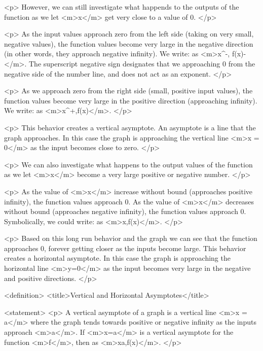         <p>
            However, we can still investigate what happends to the outputs of the function as we let <m>x</m> get very close to a value of 0.
        </p>

        <p>
            As the input values approach zero from the left side (taking on very small, negative values), the function values become very large in the negative direction (in other words, they approach negative infinity).
            We write: as <m>x^{-}, f(x)\to -\infty</m>.
            The superscript negative sign designates that we approaching 0 from the negative side of the number line, and does not act as an exponent.
        </p>

        <p>
            As we approach zero from the right side (small, positive input values), the function values become very large in the positive direction (approaching infinity).
            We write: as <m>x^{+},f(x)\to \infty</m>.
        </p>

        <p>
            This behavior creates a vertical asymptote.
            An asymptote is a line that the graph approaches.
            In this case the graph is approaching the vertical line <m>x = 0</m> as the input becomes close to zero.
        </p>

        <p>
            We can also investigate what happens to the output values of the function as we let <m>x</m> become a very large positive or negative number.
        </p>

        <p>
            As the value of <m>x</m> increase without bound (approaches positive infinity), the function values approach 0.
            As the value of <m>x</m> decreases without bound (approaches negative infinity), the function values approach 0.
            Symbolically, we could write: as <m>x\to \pm \infty,f(x)</m>.
        </p>

        <p>
            Based on this long run behavior and the graph we can see that the function approaches 0, forever getting closer as the inputs become large.
            This behavior creates a horizontal asymptote.
            In this case the graph is approaching the horizontal line <m>y=0</m> as the input becomes very large in the negative and positive directions.
        </p>

        <definition>
            <title>Vertical and Horizontal Asymptotes</title>

            <statement>
                <p>
                    A vertical asymptote of a graph is a vertical line <m>x = a</m> where the graph tends towards positive or negative infinity as the inputs approach <m>a</m>.
                    If <m>x=a</m> is a vertical asymptote for the function <m>f</m>, then as <m>x\to a,f(x)\to \pm \infty</m>.
                </p>

